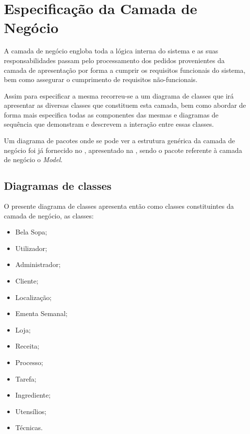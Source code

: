 
\section{Especificação da Camada de Negócio}
\label{cap:negocio}

A camada de negócio engloba toda a lógica interna do sistema e as suas responsabilidades passam pelo processamento dos pedidos provenientes da camada de apresentação por forma a cumprir os requisitos funcionais do sistema, bem como assegurar o cumprimento de requisitos não-funcionais.

Assim para especificar a mesma recorreu-se a um diagrama de classes que irá apresentar as diversas classes que constituem esta camada, bem como abordar de forma mais especifica todas as componentes das mesmas e diagramas de sequência que demonstram e descrevem a interação entre essas classes.

Um diagrama de pacotes onde se pode ver a estrutura genérica da camada de negócio foi já fornecido no , apresentado na , sendo o pacote referente à camada de negócio o \emph{Model}.

\subsection{Diagramas de classes}
\label{subsec:diagramas_classe}

O presente diagrama de classes apresenta então como classes constituintes da camada de negócio, as classes:

\begin{itemize}
    \item Bela Sopa;
    \item Utilizador;
    \item Administrador;
    \item Cliente;
    \item Localização;
    \item Ementa Semanal;
    \item Loja;
    \item Receita;
    \item Processo;
    \item Tarefa;
    \item Ingrediente;
    \item Utensílios;
    \item Técnicas.
\end{itemize}

